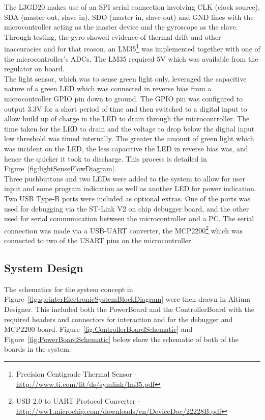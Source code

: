     The L3GD20 makes use of an SPI serial connection involving CLK (clock source), SDA (master out, slave in), SDO (master in, slave out) and GND lines with the microcontroller acting as the master device and the gyroscope as the slave. Through testing, the gyro showed evidence of thermal drift and other inaccuracies and for that reason, an LM35\footnote{Precision Centigrade Thermal Sensor - \url{http://www.ti.com/lit/ds/symlink/lm35.pdf}} was implemented together with one of the microcontroller's ADCs. The LM35 required 5V which was available from the regulator on board.\\

    The light sensor, which was to sense green light only, leveraged the capacitive nature of a green LED which was connected in reverse bias from a microcontroller GPIO pin down to ground. The GPIO pin was configured to output 3.3V for a short period of time and then switched to a digital input to allow build up of charge in the LED to drain through the microcontroller. The time taken for the LED to drain and the voltage to drop below the digital input low threshold was timed internally. The greater the amount of green light which was incident on the LED, the less capacitive the LED in reverse bias was, and hence the quicker it took to discharge. This process is detailed in Figure~\ref{fig:lightSenseFlowDiagram}.\\

    Three pushbuttons and two LEDs were added to the system to allow for user input and some program indication as well as another LED for power indication.\\

    Two USB Type-B ports were included as optional extras. One of the ports was used for debugging via the ST-Link V2 on chip debugger board, and the other used for serial communication between the microcontroller and a PC. The serial connection was made via a USB-UART converter, the MCP2200\footnote{USB 2.0 to UART Protocol Converter - \url{http://ww1.microchip.com/downloads/en/DeviceDoc/22228B.pdf}} which was connected to two of the USART pins on the microcontroller.

  \subsection{System Design}
  \label{sub:System Design}
    The schematics for the system concept in Figure~\ref{fig:sprinterElectronicSystemBlockDiagram} were then drawn in Altium Designer. This included both the PowerBoard and the ControllerBoard with the required headers and connectors for interaction and for the debugger and MCP2200 board. Figure~\ref{fig:ControllerBoardSchematic} and Figure~\ref{fig:PowerBoardSchematic} below show the schematic of both of the boards in the system.

